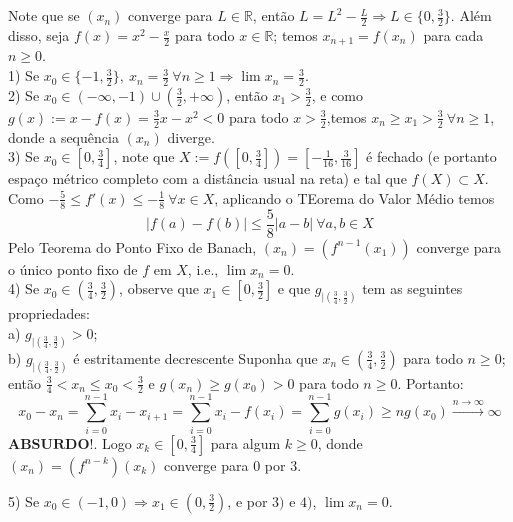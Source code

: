 \chapter{}

Note que se $(x_n)$ converge para $L\in \mathbb{R}$, então $L=L^2-\frac{L}{2}\Rightarrow L\in\{0,\frac{3}{2}\}$. Além disso, seja $f(x)=x^2-\frac{x}{2}$ para todo $x\in \mathbb{R}$; temos $x_{n+1}=f(x_n)$ para cada $n\ge 0$.\\

1) Se $x_0\in \{-1,\frac{3}{2}\},\ x_n=\frac{3}{2}\ \forall n\ge 1\Rightarrow \lim x_n=\frac{3}{2}$.\\

2) Se $x_0\in (-\infty,-1)\cup (\frac{3}{2},+\infty)$, então $x_1>\frac{3}{2}$, e como $g(x):=x-f(x)=\frac{3}{2}x-x^2<0$ para todo $x>\frac{3}{2}$,temos $x_n\ge x_1>\frac{3}{2}\ \forall n\ge 1$, donde a sequência $(x_n)$ diverge.\\

3) Se $x_0\in \left[0,\frac{3}{4}\right]$, note que $X:=f\left(\left[0,\frac{3}{4}\right]\right)=\left[-\frac{1}{16},\frac{3}{16}\right]$ é fechado (e portanto espaço métrico completo com a distância usual na reta) e tal que $f(X)\subset X$. Como $-\frac{5}{8}\le f'(x)\le -\frac{1}{8}\ \forall x\in X$, aplicando o TEorema do Valor Médio temos
$$|f(a)-f(b)|\le \frac{5}{8}|a-b|\ \forall a,b\in X$$
Pelo Teorema do Ponto Fixo de Banach, $(x_n)=(f^{n-1}(x_1))$ converge para o único ponto fixo de $f$ em $X$, i.e., $\lim x_n=0$.\\

4) Se $x_0\in \left(\frac{3}{4},\frac{3}{2}\right)$, observe que  $x_1\in \left[0,\frac{3}{2}\right]$ e que $g_{|\left(\frac{3}{4},\frac{3}{2}\right)}$ tem as seguintes propriedades:\\
a) $g_{|\left(\frac{3}{4},\frac{3}{2}\right)}>0$;\\
b) $g_{|\left(\frac{3}{4},\frac{3}{2}\right)}$ é estritamente decrescente
Suponha que $x_n\in \left(\frac{3}{4},\frac{3}{2}\right)$ para todo $n\ge 0$; então $\frac{3}{4}<x_n\le x_0<\frac{3}{2}$ e $g(x_n)\ge g(x_0)>0$ para todo $n\ge 0$. Portanto:
$$x_0-x_n=\sum_{i=0}^{n-1} x_i-x_{i+1}=\sum_{i=0}^{n-1} x_i-f(x_i)=\sum_{i=0}^{n-1} g(x_i)\ge ng(x_0)\overset{n\to \infty}{\rightarrow} \infty$$
$\textbf{ABSURDO!}$. Logo $x_k\in \left[0,\frac{3}{4}\right]$ para algum $k\ge 0$, donde $(x_n)=(f^{n-k})(x_k)$ converge para $0$ por $3$.

5) Se $x_0\in (-1,0)\Rightarrow x_1\in \left(0,\frac{3}{2}\right)$, e por $3)$ e $4)$, $\lim x_n=0$.